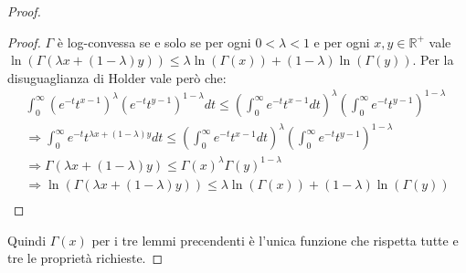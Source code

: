 \begin{proof}
\begin{proof}
       $\Gamma$ è log-convessa se e solo se per ogni $0<\lambda < 1$ e per ogni $x,y \in \mathbb{R}^+$ vale 
       $\ln(\Gamma(\lambda x+(1-\lambda)y))\le \lambda \ln(\Gamma(x))+(1-\lambda)\ln(\Gamma(y))$.
       Per la disuguaglianza di Holder vale però che:
       \begin{gather*}
       \int_0^{\infty}{(e^{-t}t^{x-1})^\lambda (e^{-t}t^{y-1})^{1-\lambda}dt} \le 
       \left(\int_0^{\infty}{e^{-t}t^{x-1}dt}\right)^\lambda \left(\int_0^{\infty}{e^{-t}t^{y-1}}\right)^{1-\lambda}\\
       \Longrightarrow \int_0^{\infty}{e^{-t}t^{\lambda x +(1-\lambda)y}dt} \le 
       \left(\int_0^{\infty}{e^{-t}t^{x-1}dt}\right)^\lambda \left(\int_0^{\infty}{e^{-t}t^{y-1}}\right)^{1-\lambda}\\
       \Longrightarrow \Gamma(\lambda x+(1-\lambda)y) \le \Gamma(x)^\lambda\Gamma(y)^{1-\lambda}\\
       \Longrightarrow \ln(\Gamma(\lambda x+(1-\lambda)y)) \le \lambda\ln(\Gamma(x))+(1-\lambda)\ln(\Gamma(y))\\
       \end{gather*}
\end{proof}
Quindi $\Gamma(x)$ per i tre lemmi precendenti è l'unica funzione che rispetta tutte e tre le proprietà richieste.
\end{proof}
